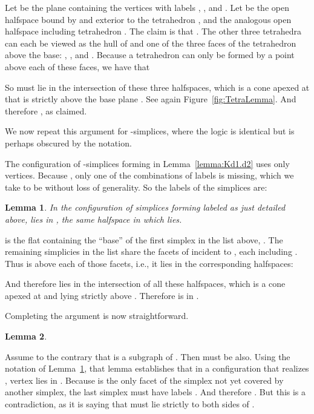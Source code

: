 \pdfoutput=1  \documentclass[]{article}
\newcommand{\ABox}{
\raisebox{3pt}{\framebox[6pt]{\rule{6pt}{0pt}}}
}
\newenvironment{proof}{{\bf Proof:}}{\hfill\ABox}
\newtheorem{lemma}{Lemma}
\newcommand{\lemlab}[1]{\label{lemma:#1}}
\newcommand{\lemref}[1]{\ref{lemma:#1}}
\newcommand{\figref}[1]{\ref{fig:#1}}
\begin{document}
Let  be the plane containing the vertices with labels
, , and .
Let  be the open halfspace bound by 
and exterior to the tetrahedron ,
and  the analogous open halfspace including tetrahedron .
The claim is that . The other three tetrahedra can each be viewed as the hull of  and
one of the three faces of the  tetrahedron above
the base: , , and .
Because a tetrahedron can only be formed by a point above
each of these faces, we have that



So  must lie in the intersection of these three halfspaces,
which is a cone apexed at  that is strictly above
the base plane .  See again Figure~\figref{TetraLemma}.
And therefore ,
as claimed.

We now repeat this argument for -simplices, where
the logic is identical but is perhaps obscured by the notation.

The configuration of  -simplices forming  in
Lemma~\lemref{Kd1.d2} uses only  vertices.
Because , only one of the combinations
of  labels is missing, which we take to be 
 without loss of generality.
So the labels of the  simplices are:






\begin{lemma}
In the configuration of  simplices forming  labeled as
just detailed above,  lies in ,
the same halfspace in which  lies.
\lemlab{Kd1}
\end{lemma}
\begin{proof}
 is the flat containing the ``base'' of the first simplex in the
list above, . The remaining  simplicies in the list share the facets of 
incident to , each including .
Thus  is above each of those facets, i.e., it lies in the
corresponding  halfspaces:



And therefore  lies in the intersection of all these halfspaces,
which is a cone apexed at  and lying strictly above .
Therefore  is in .
\end{proof}

Completing the argument is now straightforward.

\begin{lemma}

\lemlab{notKd2}
\end{lemma}
\begin{proof}
Assume to the contrary that  is a subgraph of .
Then  must be also.
Using the notation of Lemma~\lemref{Kd1},
that lemma establishes that in a configuration that
realizes , vertex  lies in 
.
Because  is the only facet of
the simplex   not yet covered by
another simplex, the last simplex  must have labels
.
And therefore .
But this is a contradiction, as it is saying that  must lie
strictly to both sides of .
\end{proof}








\end{document}
